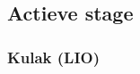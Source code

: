 \begin{landscape}
\newpage
\subsection{Actieve stage}
		\subsubsection{Kulak (LIO)}
		
		\begin{minipage}{0.5\textwidth}
			
		\end{minipage}

\end{landscape}
